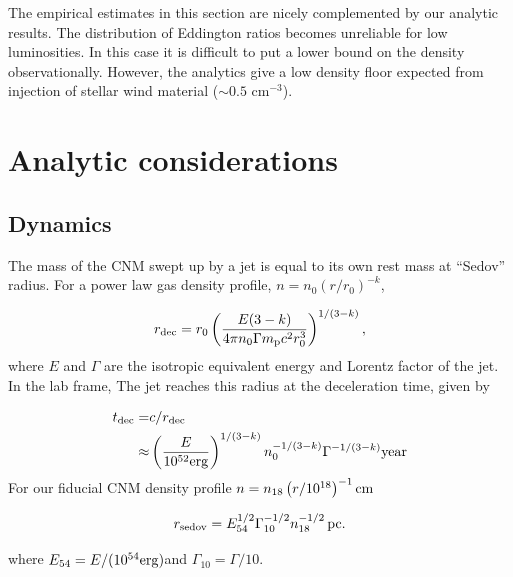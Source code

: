 \documentclass[usenatbib,fleqn]{mnras}
\begin{document}
The empirical estimates in this section are nicely complemented by our
analytic results. The distribution of Eddington ratios becomes
unreliable for low luminosities.  In this case it is difficult to put
a lower bound on the density observationally. However, the analytics
give a low density floor expected from injection of stellar wind
material ($\sim 0.5$ cm$^{-3}$).




\section{Analytic considerations}
\label{sec:jet}

\subsection{Dynamics}
\label{sec:analytic}

The mass of the CNM swept up by a jet is equal to its own rest mass at
``Sedov'' radius. For a power law gas density profile, $n= n_0 \left(r/r_0\right)^{-k}$,

\begin{equation}
  r_{\rm dec} = r_0 \left( \frac{E(3-k)}{4\pi n_{0}
      \Gamma m_{\rm p} c^2 r_0^3} \right)^{1/(3-k)}, 
  \label{eq:rdec}
\end{equation}
%
where $E$ and $\Gamma$ are the isotropic equivalent energy and Lorentz
factor of the jet. In the lab frame, The jet reaches this radius
at the deceleration time, given by

\begin{align}
 t_{\rm dec}= &c/r_{\rm dec} \nonumber\\
 \approx & \left(\frac{E}{10^{52} {\rm erg}}\right)^{1/(3-k)}
 n_0^{-1/(3-k)} \Gamma^{-1/(3-k)}{\rm year}
 \label{eq:tdec}
\end{align}
%
For our fiducial CNM density profile $n=n_{18}\left(r/10^{18}\right)^{-1} {\rm cm}$


\begin{equation}
r_{\rm sedov} = E_{54}^{1/2} \Gamma_{10}^{-1/2} n_{\rm 18}^{-1/2}\,{\rm pc}. 
\end{equation}

\noindent where $E_{54}=E/(10^{54} {\rm erg})$and $\Gamma_{10}=\Gamma/10$.
\end{document}
